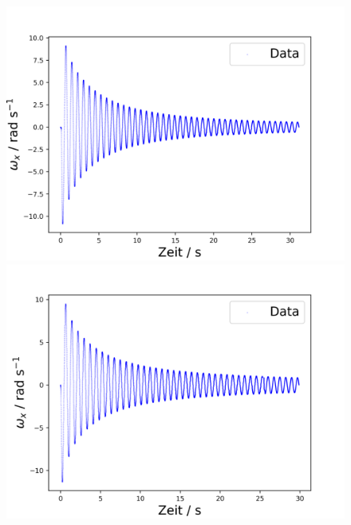 \documentclass[11pt,ngerman]{scrartcl}
\begin{document}
\begin{figure}[H]
    \centering
    \begin{minipage}[htbp]{\linewidth}
        \begin{minipage}[htbp]{.32\linewidth} %
            \includegraphics[width=\linewidth]{pics/omega/fit_of_t_wx_mess_nr_1.png}
        \end{minipage}
        \begin{minipage}[htbp]{.32\linewidth} %
            \includegraphics[width=\linewidth]{pics/omega/fit_of_t_wx_mess_nr_2.png}
        \end{minipage}
        \begin{minipage}[htbp]{.32\linewidth} %

\end{minipage}
\end{minipage}
\end{figure}
\end{document}
